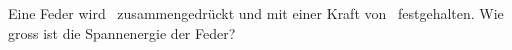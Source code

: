 Eine Feder wird \sfeO\ zusammengedrückt und mit einer Kraft von \FfeO\ festgehalten. Wie gross ist die Spannenergie der Feder?
